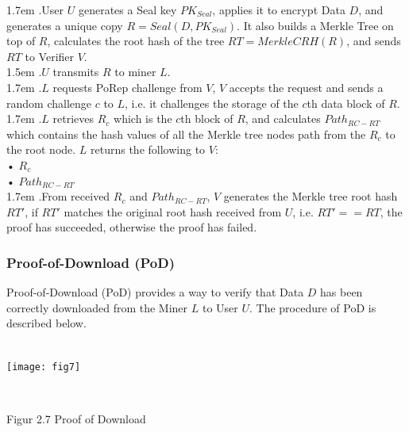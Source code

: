 \documentclass[10pt,a4paper]{article}
\begin{document}
\hangindent 1.7em
.\quad User $U$ generates a Seal key $PK_{Seal}$, applies it to encrypt Data $D$, and generates a unique copy $R=Seal(D, PK_{Seal})$. It also builds a Merkle Tree on top of $R$, calculates the root hash of the tree $RT=MerkleCRH(R)$, and sends $RT$ to Verifier $V$.
\vspace{-0.8em}
\\

\hangindent 1.5em
.\quad $U$ transmits $R$ to miner $L$.
\vspace{-0.8em}
\\

\hangindent 1.7em
.\quad $L$ requests PoRep challenge from $V$, $V$ accepts the request and sends a random challenge $c$ to $L$, i.e. it challenges the storage of the $c$th data block of $R$.
\vspace{-0.8em}
\\

\hangindent 1.7em
.\quad $L$ retrieves $R_{c}$ which is the $c$th block of $R$, and calculates $Path_{RC-RT}$ which contains the hash values of all the Merkle tree nodes path from the $R_{c}$ to the root node. $L$ returns the following to $V$:
\\•   $R_{c}$\\ 
     •  $Path_{RC-RT}$
     \vspace{-0.5em}
\\

\hangindent 1.7em
.\quad From received $R_{c}$ and $Path_{RC-RT}$, $V$ generates the Merkle tree root hash $RT'$, if $RT'$ matches the original root hash received from $U$, i.e. $RT' == RT$, the proof has succeeded, otherwise the proof has failed.  
\vspace{-0.5em}
\subsubsection{Proof-of-Download (PoD)}  %
Proof-of-Download (PoD) provides a way to verify that Data $D$ has been correctly downloaded from the Miner $L$ to User $U$. The procedure of PoD is described below.
\vspace{-0.5em}
\\ \\
\centerline{\texttt{[image: fig7]}}
 \\ \centerline{{Figur 2.7 Proof of Download}}
 \vspace{-1.5em}
\\
\end{document}
